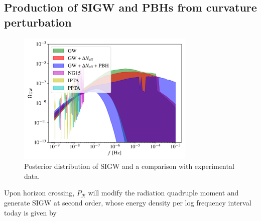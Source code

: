 \documentclass[aps, 10pt, preprintnumbers, prd, amsmath, amssymb,twocolumn, notitlepage, nofootinbib]{revtex4} %
\newcommand{\rd}{\r{d}}
\DeclareRobustCommand{\Eq}[1]{Eq.~(\ref{#1})}
\newcommand{\ps}{P_{\mathcal{R}}}
\def\r{\right)}
\newcommand{\ck}[1]{\textcolor{blue}{#1}}
\newcommand{\be}{\begin{equation}}
\newcommand{\ee}{\end{equation}}
\DeclareRobustCommand{\r}[1]{{\rm #1}}
\begin{document}
\begin{appendix}
%
%

\section{Production of SIGW and PBHs from curvature perturbation}
\begin{figure}[t]
\centering
\includegraphics[width=8.5cm]{figs/SIGW_posteriors.pdf}
\caption{
Posterior distribution of SIGW and a comparison with experimental data.
}
\label{e2f8sanb_asadwu}
\end{figure}
Upon horizon crossing,
$\ps$ will modify the radiation quadruple moment and generate SIGW at second order,
whose energy density per log frequency interval today is given by~\cite{Cang:2022jyc,Ando:2018qdb,Kohri:2018awv,Inomata:2018epa}


\end{appendix}
\end{document}

